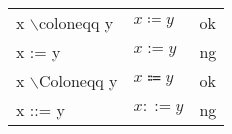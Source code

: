 \documentclass[preview]{standalone}
\newcommand{\tA}[1]{\textcolor{cA}{#1}}
\newcommand{\tD}[1]{\textcolor{cD}{#1}}
\begin{document}
\begin{table}[h]
    \centering
    \begin{tabular}{lll}
        x $\backslash$coloneqq y & $x \coloneqq y$ & \tA{ok} \\
        x := y                   & $x := y$        & \tD{ng} \\
        x $\backslash$Coloneqq y & $x \Coloneqq y$ & \tA{ok} \\
        x ::= y                  & $x ::= y$       & \tD{ng}
    \end{tabular}
\end{table}
\end{document}

